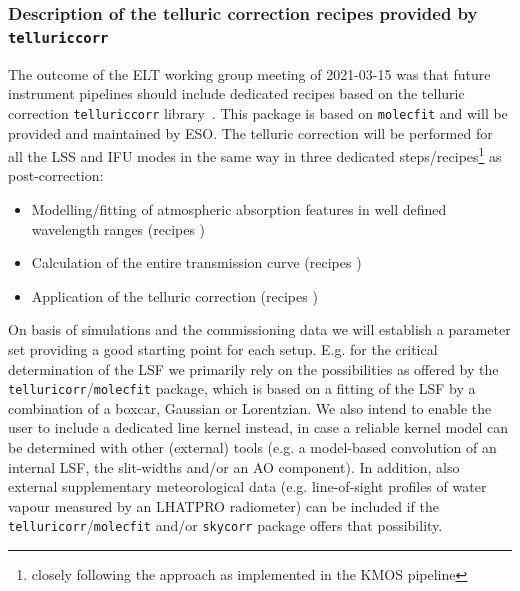 \subsubsection{Description of the telluric correction recipes provided by \texttt{telluriccorr}}\label{sec:telluriccorr_rec_desc}
The outcome of the \ac{ELT} working group meeting of 2021-03-15 was that future instrument pipelines should include dedicated recipes based on the telluric correction \texttt{telluriccorr} library~\cite{telluriccorr}. This package is based on \texttt{molecfit} and will be provided and maintained by \ac{ESO}. The telluric correction will be performed for all the LSS and IFU modes in the same way in three dedicated steps/recipes\footnote{closely following the approach as implemented in the \ac{KMOS} pipeline} as post-correction: 
\begin{itemize}
    \item Modelling/fitting of atmospheric absorption features in well defined wavelength ranges (recipes )
    \item Calculation of the entire transmission curve (recipes )
    \item Application of the telluric correction (recipes )
\end{itemize}
On basis of simulations and the commissioning data we will establish a parameter set providing a good starting point for each setup. E.g. for the critical determination of the \ac{LSF} we primarily rely on the possibilities as offered by the \texttt{telluricorr}/\texttt{molecfit} package, which is based on a fitting of the \ac{LSF} by a combination of a boxcar, Gaussian or Lorentzian. We also intend to enable the user to include a dedicated line kernel instead, in case a reliable kernel model can be determined with other (external) tools (e.g. a model-based convolution of an internal \ac{LSF}, the slit-widths and/or an \ac{AO} component). In addition, also external supplementary meteorological data (e.g. line-of-sight profiles of water vapour measured by an \ac{LHATPRO} radiometer) can be included if the \texttt{telluricorr}/\texttt{molecfit} and/or \texttt{skycorr} package offers that possibility. \\
